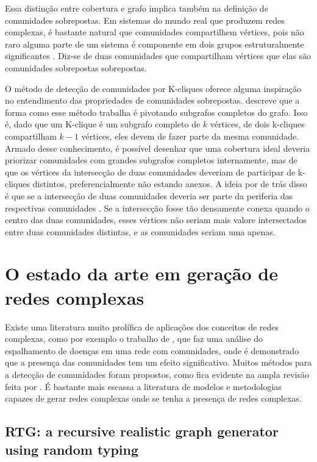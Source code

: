 \documentclass[notes.tex]{subfiles}
\begin{document}
Essa distinção entre cobertura e grafo implica também na definição de comunidades sobrepostas.
Em sistemas do mundo real que produzem redes complexas, é bastante natural que comunidades compartilhem vértices, pois não raro alguma parte de um sistema é componente em dois grupos estruturalmente significantes \cite{shen2009detect}.
Diz-se de duas comunidades que compartilham vértices que elas são comunidades sobrepostas sobrepostas.

O método de detecção de comunidades por K-cliques oferece alguma inspiração no entendimento das propriedades de comunidades sobrepostas.
 descreve que a forma como esse método trabalha é pivotando subgrafos completos do grafo.
Isso é, dado que um K-clique é um subgrafo completo de $k$ vértices, de dois k-cliques compartilham  $k-1$ vértices, eles devem de fazer parte da mesma comunidade.
Armado desse conhecimento, é possível desenhar que uma cobertura ideal deveria priorizar comunidades com grandes subgrafos completos internamente, mas de que os vértices da intersecção de duas comunidades deveriam de participar de k-cliques distintos, preferencialmente não estando anexos.
A ideia por de trás disso é que se a intersecção de duas comunidades deveria ser parte da periferia das respectivas comunidades \cite{fortunato2010community}.
Se a intersecção fosse tão densamente conexa quando o centro das duas comunidades, esses vértices não seriam mais valore intersectados entre duas comunidades distintas, e as comunidades seriam uma apenas.

\section{O estado da arte em geração de redes complexas}

Existe uma literatura muito prolífica de aplicações dos conceitos de redes complexas, como por exemplo o trabalho de , que faz uma análise do espalhamento de doenças em uma rede com comunidades, onde é demonstrado que a presença das comunidades tem um efeito significativo.
Muitos métodos para a detecção de comunidades foram propostos, como fica evidente na ampla revisão feita por .
É bastante mais escassa a literatura de modelos e metodologias capazes de gerar redes complexas onde se tenha a presença de redes complexas.

\subsection{RTG: a recursive realistic graph generator using random typing}
\end{document}
